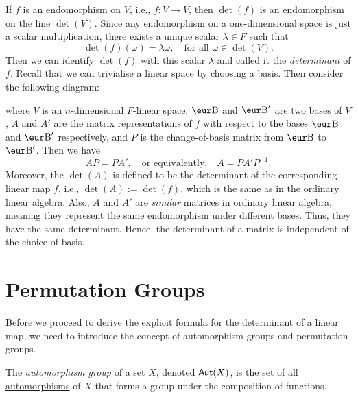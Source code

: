 If $f$ is an endomorphism on $V$, i.e., $f \colon V \to V$, then $\det(f)$ is an endomorphism on the line $\det(V)$. Since any endomorphism on a one-dimensional space is just a scalar multiplication, there exists a unique scalar $\lambda \in F$ such that
\[
  \det(f)(\omega) = \lambda \omega, \quad \text{for all } \omega \in \det(V).
\]
Then we can identify $\det(f)$ with this scalar $\lambda$ and called it the \emph{determinant} of $f$. Recall that we can trivialise a linear space by choosing a basis. Then consider the following diagram:
\begin{center}
\end{center}
where $V$ is an $n$-dimensional $F$-linear space, $\B$ and $\B'$ are two bases of $V$, $A$ and $A'$ are the matrix representations of $f$ with respect to the bases $\B$ and $\B'$ respectively, and $P$ is the change-of-basis matrix from $\B$ to $\B'$. Then we have
\[
  AP = PA', \quad \text{or equivalently,} \quad A = P A' P^{-1}.
\]
Moreover, the $\det(A)$ is defined to be the determinant of the corresponding linear map $f$, i.e., $\det(A) := \det(f)$, which is the same as in the ordinary linear algebra. Also, $A$ and $A'$ are \emph{similar} matrices in ordinary linear algebra, meaning they represent the same endomorphism under different bases. Thus, they have the same determinant. Hence, the determinant of a matrix is independent of the choice of basis.

\section{Permutation Groups}

Before we proceed to derive the explicit formula for the determinant of a linear map, we need to introduce the concept of automorphism groups and permutation groups.

\begin{definition}\label{def:automorphism_group}
  The \emph{automorphism group} of a set $X$, denoted $\operatorname{\text{\normalfont\sffamily Aut}}(X)$, is the set of all \hyperref[def:automorphism]{automorphisms} of $X$ that forms a group under the composition of functions.
\end{definition}

